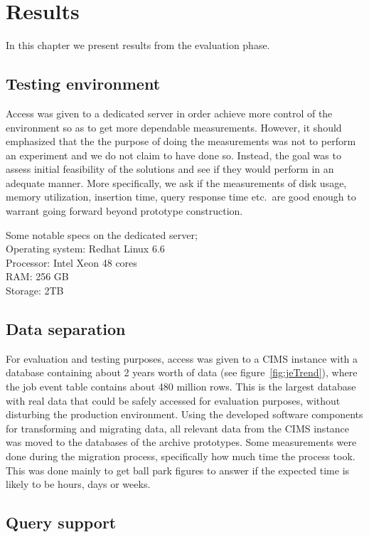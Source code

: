 \chapter{Results}
\label{chap:results}

In this chapter we present results from the evaluation phase.

\section{Testing environment}
Access was given to a dedicated server in order achieve more control of the environment so as to get more dependable measurements. However, it should emphasized that the the purpose of doing the measurements was not to perform an experiment and we do not claim to have done so. Instead, the goal was to assess initial feasibility of the solutions and see if they would perform in an adequate manner. More specifically, we ask if the measurements of disk usage, memory utilization, insertion time, query response time etc.\ are good enough to warrant going forward beyond prototype construction.

Some notable specs on the dedicated server; \\
Operating system: Redhat Linux 6.6 \\
Processor: Intel Xeon 48 cores \\
RAM: 256 GB \\
Storage: 2TB


\section{Data separation}
For evaluation and testing purposes, access was given to a CIMS instance with a database containing about 2 years worth of data (see figure~\ref{fig:jeTrend}), where the job event table contains about 480 million rows. This is the largest database with real data that could be safely accessed for evaluation purposes, without disturbing the production environment. Using the developed software components for transforming and migrating data, all relevant data from the CIMS instance was moved to the databases of the archive prototypes. Some measurements were done during the migration process, specifically how much time the process took. This was done mainly to get ball park figures to answer if the expected time is likely to be hours, days or weeks.     
 

\section{Query support}

